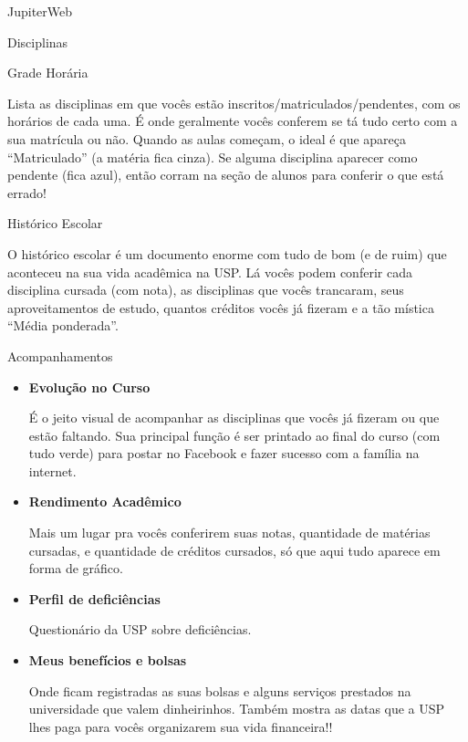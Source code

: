 \begin{secao}{JupiterWeb}
\begin{subsecao}{Disciplinas}
\end{subsecao}

\begin{subsecao}{Grade Horária}

Lista as disciplinas em que vocês estão inscritos/matriculados/pendentes, com os
horários de cada uma. É onde geralmente vocês conferem se tá tudo certo com a
sua matrícula ou não. Quando as aulas começam, o ideal é que apareça
“Matriculado” (a matéria fica cinza). Se alguma disciplina aparecer como
pendente (fica azul), então corram na seção de alunos para conferir o que está
errado!

\end{subsecao}
\pagebreak
\begin{subsecao}{Histórico Escolar}

O histórico escolar é um documento enorme com tudo de bom (e de ruim) que
aconteceu na sua vida acadêmica na USP. Lá vocês podem conferir cada
disciplina cursada (com nota), as disciplinas que vocês trancaram, seus
aproveitamentos de estudo, quantos créditos vocês já fizeram e a tão mística
“Média ponderada”.

\end{subsecao}

\begin{subsecao}{Acompanhamentos}

\begin{itemize}
  \item \textbf{Evolução no Curso}

    É o jeito visual de acompanhar as disciplinas que vocês já fizeram ou que
    estão faltando. Sua principal função é ser printado ao final do curso (com
    tudo verde) para postar no Facebook e fazer sucesso com a família na
    internet.
  \item \textbf{Rendimento Acadêmico}

    Mais um lugar pra vocês conferirem suas notas, quantidade de matérias
    cursadas, e quantidade de créditos cursados, só que aqui tudo aparece em
    forma de gráfico.
  \item \textbf{Perfil de deficiências}

    Questionário da USP sobre deficiências.

  \item \textbf{Meus benefícios e bolsas}

    Onde ficam registradas as suas bolsas e alguns serviços prestados na
    universidade que valem dinheirinhos. Também mostra as datas que a USP lhes
    paga para vocês organizarem sua vida financeira!!


\end{itemize}
\end{subsecao}
\end{secao}
